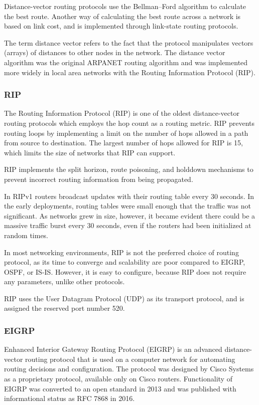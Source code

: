 \documentclass[a4paper,12pt]{article}
\begin{document}
Distance-vector routing protocols use the Bellman–Ford algorithm to calculate the best route. Another way of calculating the best route across a network is based on link cost, and is implemented through link-state routing protocols.

The term distance vector refers to the fact that the protocol manipulates vectors (arrays) of distances to other nodes in the network. The distance vector algorithm was the original ARPANET routing algorithm and was implemented more widely in local area networks with the Routing Information Protocol (RIP).

\subsubsection{RIP}
The Routing Information Protocol (RIP) is one of the oldest distance-vector routing protocols which employs the hop count as a routing metric. RIP prevents routing loops by implementing a limit on the number of hops allowed in a path from source to destination. The largest number of hops allowed for RIP is 15, which limits the size of networks that RIP can support.

RIP implements the split horizon, route poisoning, and holddown mechanisms to prevent incorrect routing information from being propagated.

In RIPv1 routers broadcast updates with their routing table every 30 seconds. In the early deployments, routing tables were small enough that the traffic was not significant. As networks grew in size, however, it became evident there could be a massive traffic burst every 30 seconds, even if the routers had been initialized at random times.

In most networking environments, RIP is not the preferred choice of routing protocol, as its time to converge and scalability are poor compared to EIGRP, OSPF, or IS-IS. However, it is easy to configure, because RIP does not require any parameters, unlike other protocols.

RIP uses the User Datagram Protocol (UDP) as its transport protocol, and is assigned the reserved port number 520.

\subsubsection{EIGRP}
Enhanced Interior Gateway Routing Protocol (EIGRP) is an advanced distance-vector routing protocol that is used on a computer network for automating routing decisions and configuration. The protocol was designed by Cisco Systems as a proprietary protocol, available only on Cisco routers. Functionality of EIGRP was converted to an open standard in 2013 and was published with informational status as RFC 7868 in 2016.
\end{document}
